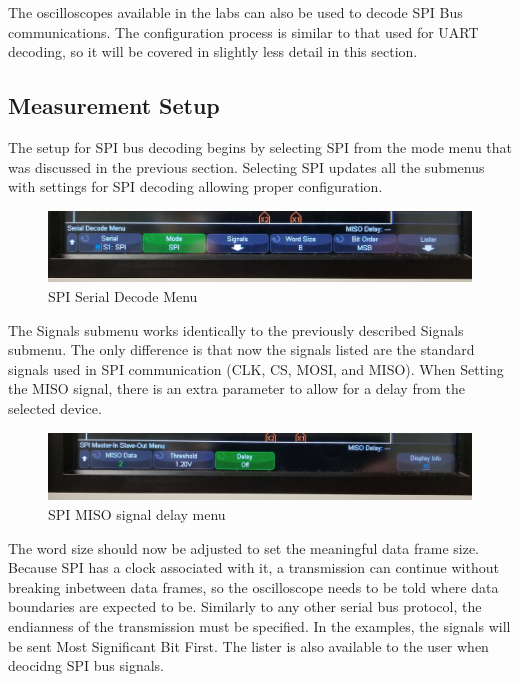 \documentclass{article}
\begin{document}
  The oscilloscopes available in the labs can also be used to decode SPI Bus
  communications. The configuration process is similar to that used for UART decoding,
  so it will be covered in slightly less detail in this section.

  \subsection{Measurement Setup}

  The setup for SPI bus decoding begins by selecting SPI from the mode menu that
  was discussed in the previous section. Selecting SPI updates all the submenus
  with settings for SPI decoding allowing proper configuration.

  \begin{figure}[h]
    \includegraphics[width=\textwidth]{spi_serial_menu}
    \caption{SPI Serial Decode Menu}
  \end{figure}

  The Signals submenu works identically to the previously described Signals
  submenu. The only difference is that now the signals listed are the standard
  signals used in SPI communication (CLK, CS, MOSI, and MISO). When Setting the
  MISO signal, there is an extra parameter to allow for a delay from the
  selected device.

  \begin{figure}[h]
    \includegraphics[width=\textwidth]{spi_slave_delay}
    \caption{SPI MISO signal delay menu}
  \end{figure}

  The word size should now be adjusted to set the meaningful data frame size.
  Because SPI has a clock associated with it, a transmission can continue
  without breaking inbetween data frames, so the oscilloscope needs to be told
  where data boundaries are expected to be.
  Similarly to any other serial bus protocol, the endianness of the transmission
  must be specified. In the examples, the signals will be sent Most Significant
  Bit First.
  The lister is also available to the user when deocidng SPI bus signals.
\end{document}
